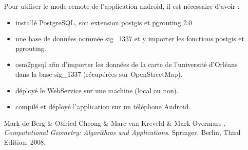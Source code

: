 \documentclass[12pt,a4paper,oneside]{article}
\begin{document}
Pour utiliser le mode remote de l'application android, il est nécessaire d'avoir :
\begin{itemize}
\item installé PostgreSQL, son extension postgis et pgrouting 2.0
\item une base de données nommée sig\_1337 et y importer les fonctions postgis et pgrouting.
\item osm2pgsql afin d'importer les données de la carte de l'université d'Orléans dans la base sig\_1337 (récupérées sur OpenStreetMap).
\item déployé le WebService sur une machine (local ou non).
\item compilé et déployé l'application sur un téléphone Android.
\end{itemize}

\begin{thebibliography}{9}

  Mark de Berg \& Otfried Cheong \& Marc van Kreveld \& Mark Overmars ,
  \emph{Computational Geometry: Algorithms and Applications}.
  Springer, Berlin,
  Third Edition,
  2008.

\end{thebibliography}
\appendix
\end{document}
